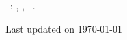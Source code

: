 \hfill
\vfill

{
	\setlength\parindent{0pt}

    \AuthorName\ \AuthorSurname: \textit{\Title}, \DegreeName, \textcopyright\ \CopyrightYear.
    \par\hfill{\scriptsize\color{gray}Last updated on \today}
}
